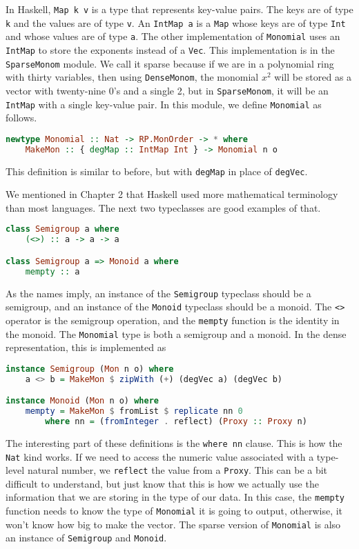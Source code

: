 \documentclass[MS, xcolor=dvipsnames]{wfuthesis}
\theoremstyle{definition}
\begin{document}
In Haskell, \lstinline{Map k v} is a type that represents key-value pairs. The keys are of type \lstinline{k} and the values are of type \lstinline{v}. An \lstinline{IntMap a} is a \lstinline{Map} whose keys are of type \lstinline{Int} and whose values are of type \lstinline{a}. The other implementation of \lstinline{Monomial} uses an \lstinline{IntMap} to store the exponents instead of a \lstinline{Vec}. This implementation is in the \lstinline{SparseMonom} module. We call it sparse because if we are in a polynomial ring with thirty variables, then using \lstinline{DenseMonom}, the monomial $x^2$ will be stored as a vector with twenty-nine 0's and a single 2, but in \lstinline{SparseMonom}, it will be an \lstinline{IntMap} with a single key-value pair. In this module, we define \lstinline{Monomial} as follows.
\begin{lstlisting}[language=Haskell]
newtype Monomial :: Nat -> RP.MonOrder -> * where
    MakeMon :: { degMap :: IntMap Int } -> Monomial n o
\end{lstlisting}
This definition is similar to before, but with \lstinline{degMap} in place of \lstinline{degVec}. \par 
We mentioned in Chapter 2 that Haskell used more mathematical terminology than most languages. The next two typeclasses are good examples of that. 
\begin{lstlisting}[language=Haskell]
class Semigroup a where
    (<>) :: a -> a -> a

class Semigroup a => Monoid a where
    mempty :: a
\end{lstlisting}
As the names imply, an instance of the \lstinline{Semigroup} typeclass should be a semigroup, and an instance of the \lstinline{Monoid} typeclass should be a monoid. The \lstinline{<>} operator is the semigroup operation, and the \lstinline{mempty} function is the identity in the monoid. The \lstinline{Monomial} type is both a semigroup and a monoid. In the dense representation, this is implemented as 
\begin{lstlisting}[language=Haskell]
instance Semigroup (Mon n o) where
    a <> b = MakeMon $ zipWith (+) (degVec a) (degVec b)

instance Monoid (Mon n o) where
    mempty = MakeMon $ fromList $ replicate nn 0
        where nn = (fromInteger . reflect) (Proxy :: Proxy n)
\end{lstlisting}
The interesting part of these definitions is the \lstinline{where nn} clause. This is how the \lstinline{Nat} kind works. If we need to access the numeric value associated with a type-level natural number, we \lstinline{reflect} the value from a \lstinline{Proxy}. This can be a bit difficult to understand, but just know that this is how we actually use the information that we are storing in the type of our data. In this case, the \lstinline{mempty} function needs to know the type of \lstinline{Monomial} it is going to output, otherwise, it won't know how big to make the vector. The sparse version of \lstinline{Monomial} is also an instance of \lstinline{Semigroup} and \lstinline{Monoid}. 
\end{document}
